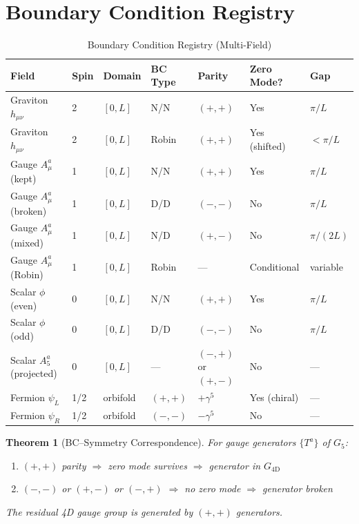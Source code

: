\documentclass[11pt,a4paper]{article}
\newtheorem{theorem}{Theorem}[section]
\begin{document}
\section{Boundary Condition Registry}
\label{sec:bc-registry}

\begin{table}[ht]
\centering
\caption{Boundary Condition Registry (Multi-Field)}
\label{tab:bc-registry}
\small
\begin{tabular}{llllllp{3cm}}
\toprule
Field & Spin & Domain & BC Type & Parity & Zero Mode? & Gap \\
\midrule
Graviton $h_{\mu\nu}$ & 2 & $[0,L]$ & N/N & $(+,+)$ & Yes & $\pi/L$ \\
Graviton $h_{\mu\nu}$ & 2 & $[0,L]$ & Robin & $(+,+)$ & Yes (shifted) & $< \pi/L$ \\
\midrule
Gauge $A_\mu^a$ (kept) & 1 & $[0,L]$ & N/N & $(+,+)$ & Yes & $\pi/L$ \\
Gauge $A_\mu^a$ (broken) & 1 & $[0,L]$ & D/D & $(-,-)$ & No & $\pi/L$ \\
Gauge $A_\mu^a$ (mixed) & 1 & $[0,L]$ & N/D & $(+,-)$ & No & $\pi/(2L)$ \\
Gauge $A_\mu^a$ (Robin) & 1 & $[0,L]$ & Robin & — & Conditional & variable \\
\midrule
Scalar $\phi$ (even) & 0 & $[0,L]$ & N/N & $(+,+)$ & Yes & $\pi/L$ \\
Scalar $\phi$ (odd) & 0 & $[0,L]$ & D/D & $(-,-)$ & No & $\pi/L$ \\
Scalar $A_5^a$ (projected) & 0 & $[0,L]$ & — & $(-,+)$ or $(+,-)$ & No & — \\
\midrule
Fermion $\psi_L$ & 1/2 & orbifold & $(+,+)$ & $+\gamma^5$ & Yes (chiral) & — \\
Fermion $\psi_R$ & 1/2 & orbifold & $(-,-)$ & $-\gamma^5$ & No & — \\
\bottomrule
\end{tabular}
\end{table}

\begin{theorem}[BC--Symmetry Correspondence]
\label{thm:bc-symmetry}
For gauge generators $\{T^a\}$ of $G_5$:
\begin{enumerate}
  \item $(+,+)$ parity $\Rightarrow$ zero mode survives $\Rightarrow$ generator in $G_{\text{4D}}$
  \item $(-,-)$ or $(+,-)$ or $(-,+)$ $\Rightarrow$ no zero mode $\Rightarrow$ generator broken
\end{enumerate}
The residual 4D gauge group is generated by $(+,+)$ generators.
\end{theorem}
\end{document}
